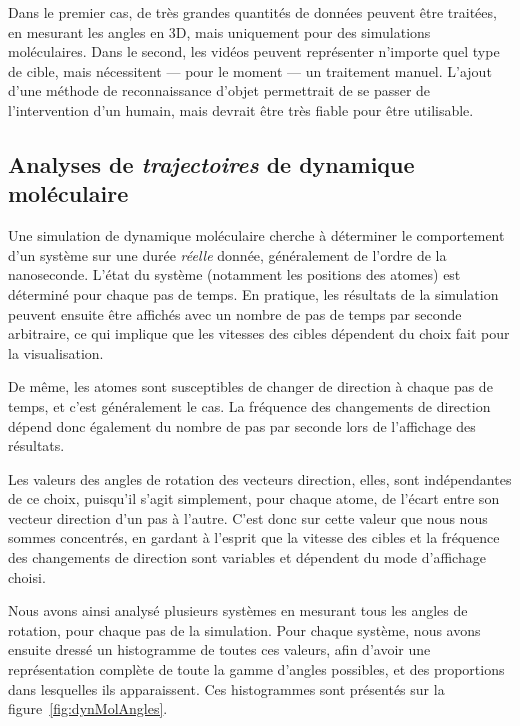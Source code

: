 	Dans le premier cas, de très grandes quantités de données peuvent être traitées, en mesurant les angles en 3D, mais uniquement pour des simulations moléculaires. Dans le second, les vidéos peuvent représenter n'importe quel type de cible, mais nécessitent --- pour le moment --- un traitement manuel. L'ajout d'une méthode de reconnaissance d'objet permettrait de se passer de l'intervention d'un humain, mais devrait être très fiable pour être utilisable.
	
	\FloatBarrier \subsection{Analyses de \emph{trajectoires} de dynamique moléculaire}
	Une simulation de dynamique moléculaire cherche à déterminer le comportement d'un système sur une durée \emph{réelle} donnée, généralement de l'ordre de la nanoseconde. L'état du système (notamment les positions des atomes) est déterminé pour chaque pas de temps. En pratique, les résultats de la simulation peuvent ensuite être affichés avec un nombre de pas de temps par seconde arbitraire, ce qui implique que les vitesses des cibles dépendent du choix fait pour la visualisation.
	
	De même, les atomes sont susceptibles de changer de direction à chaque pas de temps, et c'est généralement le cas. La fréquence des changements de direction dépend donc également du nombre de pas par seconde lors de l'affichage des résultats.
	
	Les valeurs des angles de rotation des vecteurs direction, elles, sont indépendantes de ce choix, puisqu'il s'agit simplement, pour chaque atome, de l'écart entre son vecteur direction d'un pas à l'autre. C'est donc sur cette valeur que nous nous sommes concentrés, en gardant à l'esprit que la vitesse des cibles et la fréquence des changements de direction sont variables et dépendent du mode d'affichage choisi.
	
	Nous avons ainsi analysé plusieurs systèmes en mesurant tous les angles de rotation, pour chaque pas de la simulation. Pour chaque système, nous avons ensuite dressé un histogramme de toutes ces valeurs, afin d'avoir une représentation complète de toute la gamme d'angles possibles, et des proportions dans lesquelles ils apparaissent. Ces histogrammes sont présentés sur la figure~\ref{fig:dynMolAngles}.
	
